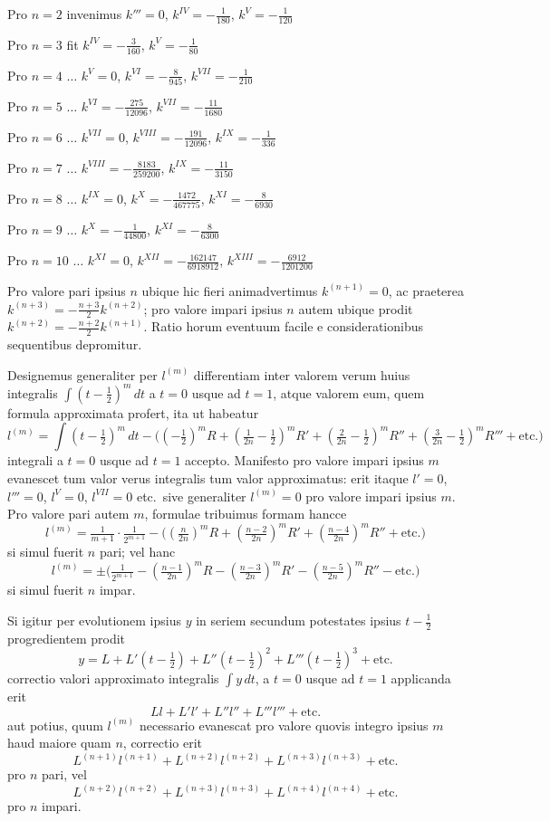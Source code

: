 \documentclass[12pt,a4paper]{article}
\begin{document}
Pro $n=2$ invenimus $k'''=0$, $k^{IV}=-\frac{1}{180}$, $k^{V}=-\frac{1}{120}$

Pro $n=3$ fit $k^{IV}=-\frac{3}{160}$, $k^{V}=-\frac{1}{80}$

Pro $n=4$ $\ldots$ $k^{V}=0$, $k^{VI}=-\frac{8}{945}$, $k^{VII}=-\frac{1}{210}$

Pro $n=5$ $\ldots$ $k^{VI}=-\frac{275}{12096}$, $k^{VII}=-\frac{11}{1680}$

Pro $n=6$ $\ldots$ $k^{VII}=0$, $k^{VIII}=-\frac{191}{12096}$, $k^{IX}=-\frac{1}{336}$

Pro $n=7$ $\ldots$ $k^{VIII}=-\frac{8183}{259200}$, $k^{IX}=-\frac{11}{3150}$

Pro $n=8$ $\ldots$ $k^{IX}=0$, $k^{X}=-\frac{1472}{467775}$, $k^{XI}=-\frac{8}{6930}$

Pro $n=9$ $\ldots$ $k^{X}=-\frac{1}{44800}$, $k^{XI}=-\frac{8}{6300}$

Pro $n=10$ $\ldots$ $k^{XI}=0$, $k^{XII}=-\frac{162147}{6918912}$, $k^{XIII}=-\frac{6912}{1201200}$

Pro valore pari ipsius $n$ ubique hic fieri animadvertimus $k^{(n+1)}=0$, ac praeterea $k^{(n+3)}=-\frac{n+3}{2}k^{(n+2)}$; pro valore impari ipsius $n$ autem ubique prodit $k^{(n+2)}=-\frac{n+2}{2}k^{(n+1)}$. Ratio horum eventuum facile e considerationibus sequentibus depromitur.

Designemus generaliter per $l^{(m)}$ differentiam inter valorem verum huius integralis $\int\!(t-\frac{1}{2})^m\,dt$ a $t=0$ usque ad $t=1$, atque valorem eum, quem formula approximata profert, ita ut habeatur
\[
l^{(m)} = \int\!(t-\tfrac{1}{2})^m\,dt - \bigl((-\tfrac{1}{2})^m R + (\tfrac{1}{2n}-\tfrac{1}{2})^m R' + (\tfrac{2}{2n}-\tfrac{1}{2})^m R'' + (\tfrac{3}{2n}-\tfrac{1}{2})^m R''' + \text{etc.}\bigr)
\]
integrali a $t=0$ usque ad $t=1$ accepto. Manifesto pro valore impari ipsius $m$ evanescet tum valor verus integralis tum valor approximatus: erit itaque $l'=0$, $l'''=0$, $l^{V}=0$, $l^{VII}=0$ etc.\ sive generaliter $l^{(m)}=0$ pro valore impari ipsius $m$. Pro valore pari autem $m$, formulae tribuimus formam hancce
\[
l^{(m)} = \tfrac{1}{m+1}\cdot\tfrac{1}{2^{m+1}} - \bigl((\tfrac{n}{2n})^m R + (\tfrac{n-2}{2n})^m R' + (\tfrac{n-4}{2n})^m R'' + \text{etc.}\bigr)
\]
si simul fuerit $n$ pari; vel hanc
\[
l^{(m)} = \pm\bigl(\tfrac{1}{2^{m+1}} - (\tfrac{n-1}{2n})^m R - (\tfrac{n-3}{2n})^m R' - (\tfrac{n-5}{2n})^m R'' - \text{etc.}\bigr)
\]
si simul fuerit $n$ impar.

Si igitur per evolutionem ipsius $y$ in seriem secundum potestates ipsius $t-\frac{1}{2}$ progredientem prodit
\[
y = L + L'(t-\tfrac{1}{2}) + L''(t-\tfrac{1}{2})^2 + L'''(t-\tfrac{1}{2})^3 + \text{etc.}
\]
correctio valori approximato integralis $\int\!y\,dt$, a $t=0$ usque ad $t=1$ applicanda erit
\[
Ll + L'l' + L''l'' + L'''l''' + \text{etc.}
\]
aut potius, quum $l^{(m)}$ necessario evanescat pro valore quovis integro ipsius $m$ haud maiore quam $n$, correctio erit
\[
L^{(n+1)}l^{(n+1)} + L^{(n+2)}l^{(n+2)} + L^{(n+3)}l^{(n+3)} + \text{etc.}
\]
pro $n$ pari, vel
\[
L^{(n+2)}l^{(n+2)} + L^{(n+3)}l^{(n+3)} + L^{(n+4)}l^{(n+4)} + \text{etc.}
\]
pro $n$ impari.
\end{document}
